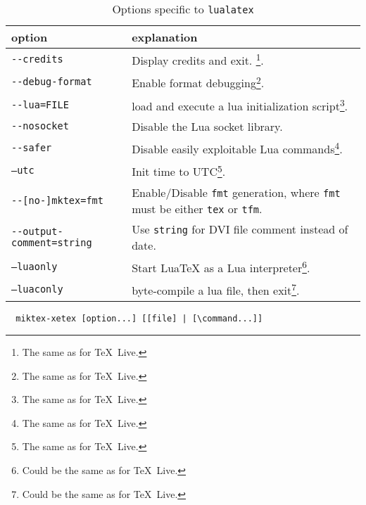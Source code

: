 \documentclass{article}
\newcommand{\lualatex}{\texttt{lualatex}}
\newcommand{\texlive}{\TeX~Live}
\begin{document}
\begin{longtable}{|ll|}
  \toprule
  option & explanation \\
  \midrule
  \midrule
  \endfirsthead%
  \bottomrule
  \caption{\label{tab:latexOptionsLualatexMiktex} Options specific to \lualatex{} }
  \endlastfoot%
  \texttt{-{}-credits}                    & Display credits and exit. \footnote%
  {The same as for \texlive. }. \\
  \texttt{-{}-debug-format}               & Enable format debugging\footnote%
  {The same as for \texlive. }. \\
  \texttt{-{}-lua=FILE}                   & load and execute a lua initialization script\footnote%
  {The same as for \texlive. }.   \\
  \texttt{-{}-nosocket}                   & Disable the Lua socket library. \\
  \texttt{-{}-safer}                      & Disable easily exploitable Lua commands\footnote%
  {The same as for \texlive. }.   \\
  \texttt{--utc}                          & Init time to UTC\footnote%
  {The same as for \texlive. }.  \\
  \midrule
  \texttt{-{}-[no-]mktex=fmt} & Enable/Disable \texttt{fmt} generation, where \texttt{fmt} must be either \texttt{tex} or \texttt{tfm}. \\
  \texttt{-{}-output-comment=string} & Use \texttt{string} for DVI file comment instead of date. \\
  \midrule
  \texttt{--luaonly}                      & Start LuaTeX as a Lua interpreter\footnote%
  {Could be the same as for \texlive. }.  \\
  \texttt{--luaconly}                     & byte-compile a lua file, then exit\footnote%
  {Could be the same as for \texlive. }. \\
  \end{longtable}


  
  
  

\begin{verbatim}
  miktex-xetex [option...] [[file] | [\command...]]
\end{verbatim}
\end{document}
